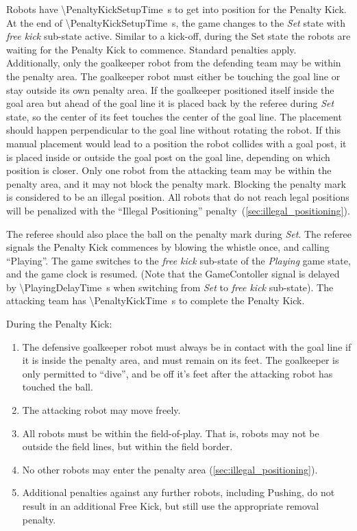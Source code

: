 Robots have \qty{\PenaltyKickSetupTime}{\second} to get into position for the Penalty Kick. At the end of \qty{\PenaltyKickSetupTime}{\second}, the game changes to the \textit{Set} state with \textit{free kick} sub-state active.
Similar to a kick-off, during the Set state the robots are waiting for the Penalty Kick to commence.
Standard penalties apply.
Additionally, only the goalkeeper robot from the defending team may be within the penalty area. The goalkeeper robot must either be touching the goal line or stay outside its own penalty area. If the goalkeeper positioned itself inside the goal area but ahead of the goal line it is placed back by the referee during \textit{Set} state, so the center of its feet touches the center of the goal line. The placement should happen perpendicular to the goal line without rotating the robot. If this manual placement would lead to a position the robot collides with a goal post, it is placed inside or outside the goal post on the goal line, depending on which position is closer.
Only one robot from the attacking team may be within the penalty area, and it may not block the penalty mark.
Blocking the penalty mark is considered to be an illegal position.
All robots that do not reach legal positions will be penalized with the ``Illegal Positioning'' penalty~(\cf \cref{sec:illegal_positioning}).

The referee should also place the ball on the penalty mark during \textit{Set}.
The referee signals the Penalty Kick commences by blowing the whistle once, and calling ``Playing''.
The game switches to the \textit{free kick} sub-state of the \textit{Playing} game state, and the game clock is resumed.
(Note that the GameContoller signal is delayed by \qty{\PlayingDelayTime}{\second} when switching from \textit{Set} to \textit{free kick} sub-state).
The attacking team has \qty{\PenaltyKickTime}{\second} to complete the Penalty Kick.

During the Penalty Kick:
\begin{enumerate}
    \item The defensive goalkeeper robot must always be in contact with the goal line if it is inside the penalty area, and must remain on its feet. The goalkeeper is only permitted to ``dive'', and be off it's feet after the attacking robot has touched the ball.
    \item The attacking robot may move freely.
    \item All robots must be within the field-of-play. That is, robots may not be outside the field lines, but within the field border.
    \item No other robots may enter the penalty area (\cf \cref{sec:illegal_positioning}).
    \item Additional penalties against any further robots, including Pushing, do not result in an additional Free
    Kick, but still use the appropriate removal penalty.
\end{enumerate}

